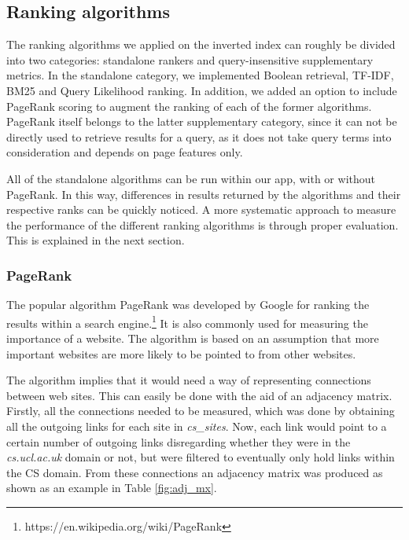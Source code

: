 

\subsection{Ranking algorithms}
\label{sub:ranking}

The ranking algorithms we applied on the inverted index can roughly be divided into two categories: standalone rankers and query-insensitive supplementary metrics. In the standalone category, we implemented Boolean retrieval, TF-IDF, BM25 and Query Likelihood ranking. In addition, we added an option to include PageRank scoring to augment the ranking of each of the former algorithms. PageRank itself belongs to the latter supplementary category, since it can not be directly used to retrieve results for a query, as it does not take query terms into consideration and depends on page features only.

All of the standalone algorithms can be run within our app, with or without PageRank. In this way, differences in results returned by the algorithms and their respective ranks can be quickly noticed. A more systematic approach to measure the performance of the different ranking algorithms is through proper evaluation. This is explained in the next section.


\subsubsection{PageRank} %
\label{ssub:pagerank}

The popular algorithm PageRank was developed by Google for ranking the results within a search engine.\footnote{https://en.wikipedia.org/wiki/PageRank} It is also commonly used for measuring the importance of a website. The algorithm is based on an assumption that more important websites are more likely to be pointed to from other websites.

The algorithm implies that it would need a way of representing connections between web sites. This can easily be done with the aid of an adjacency matrix. Firstly, all the connections needed to be measured, which was done by obtaining all the outgoing links for each site in \emph{cs\_sites}. Now, each link would point to a certain number of outgoing links disregarding whether they were in the \emph{cs.ucl.ac.uk} domain or not, but were filtered to eventually only hold links within the CS domain. From these connections an adjacency matrix was produced as shown as an example in Table \ref{fig:adj_mx}. 

